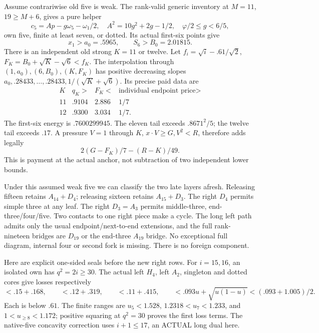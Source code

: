 \documentclass[11pt]{article}
\theoremstyle{definition}
\theoremstyle{remark}
\begin{document}
Assume contrariwise old five is
weak.
The rank-valid generic inventory
at \(M=11\), \(19\ge M+6\),
gives a pure helper
\[
 c_5=Ap-g\omega_5-\omega_1/2,\quad
 A^2=10g^2+2g-1/2,\quad
                 \varphi/2\le g<6/5 ,
\]
own five, finite at least seven,
or dotted.
Its actual first-six points give
\[
                         x_1>a_0=.5965,\qquad S_6>B_0=2.01815 .
\]
There is an independent old strong
\(K=11\) or twelve.
Let \(f_i=\sqrt i-.61/\sqrt2\),
\(F_K=B_0+\sqrt K-\sqrt6<f_K\).
The interpolation through
\((1,a_0),(6,B_0),(K,F_K)\)
has positive decreasing slopes
\(a_0,.28433,\ldots,.28433,
1/(\sqrt K+\sqrt6)\).
Its precise paid data are
\[
\begin{array}{c|c|c|c}
 K&q_K>&F_K<&\text{individual endpoint price}>\\ \hline
 11&.9104&2.886&1/7\\
 12&.9300&3.034&1/7 .
\end{array}
\]
The first-six energy is
\(.7600299945\).
The eleven tail exceeds
\(.8671^2/5\); the twelve tail
exceeds \(.17\).
A pressure \(V=1\) through \(K\),
\(x\cdot V\ge G,V^2<R\), therefore
adds legally
\[
                            2(G-F_K)/7-(R-K)/49 .
\tag{D19weak5ref}\label{app:exact19:eq:Dweak5ref}
\]
This is payment at the actual
anchor, not subtraction of two
independent lower bounds.

Under this assumed weak five
we can classify the two late
layers afresh.
Releasing fifteen retains
\(A_{14}+D_4\); releasing sixteen
retains \(A_{15}+D_3\).
The right \(D_4\) permits simple
three at any leaf.
The right \(D_3=A_3\) permits
middle-three, end-three/four/five.
Two contacts to one right piece
make a cycle.
The long left path admits only
the usual endpoint/next-to-end
extensions, and the full rank-
nineteen bridges are \(D_{19}\)
or the end-three \(A_{19}\)
bridge.
No exceptional full diagram,
internal four or second fork
is missing.
There is no foreign component.

Here are explicit one-sided
seals before the new right rows.
For \(i=15,16\), an isolated
own has \(q^2=2i\ge30\).
The actual left \(H_4\), left
\(A_2\), singleton and dotted
cores give losses respectively
\[
 <.15+.168,\qquad <.12+.319,\qquad
 <.11+.415,\qquad
 <.093u+\sqrt{u(1-u)}
                 <(.093+1.005)/2 .
\]
Each is below \(.61\).
The finite ranges are
\(u_5<1.528\), \(1.2318<u_7<1.233\),
and \(1<u_{\ge8}<1.172\);
positive squaring at \(q^2=30\)
proves the first loss terms.
The native-five concavity correction
uses \(i+1\le17\), an ACTUAL
long dual here.
\end{document}
